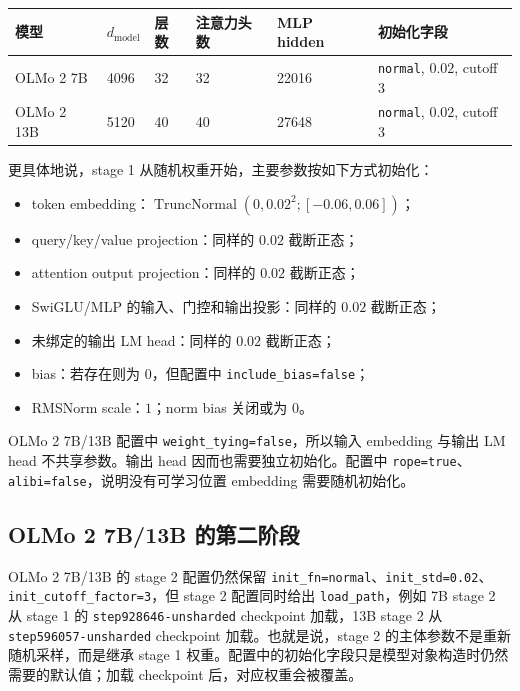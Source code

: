 \documentclass[UTF8,a4paper,11pt]{ctexart}
\newcommand{\TruncNormal}{\operatorname{TruncNormal}}
\begin{document}
\begin{center}
\begin{tabular}{llllll}
\toprule
模型 & $d_{\mathrm{model}}$ & 层数 & 注意力头数 & MLP hidden & 初始化字段 \\
\midrule
OLMo 2 7B & 4096 & 32 & 32 & 22016 & \texttt{normal}, $0.02$, cutoff $3$ \\
OLMo 2 13B & 5120 & 40 & 40 & 27648 & \texttt{normal}, $0.02$, cutoff $3$ \\
\bottomrule
\end{tabular}
\end{center}

更具体地说，stage 1 从随机权重开始，主要参数按如下方式初始化：

\begin{itemize}
  \item token embedding：$\TruncNormal(0,0.02^2;[-0.06,0.06])$；
  \item query/key/value projection：同样的 $0.02$ 截断正态；
  \item attention output projection：同样的 $0.02$ 截断正态；
  \item SwiGLU/MLP 的输入、门控和输出投影：同样的 $0.02$ 截断正态；
  \item 未绑定的输出 LM head：同样的 $0.02$ 截断正态；
  \item bias：若存在则为 $0$，但配置中 \texttt{include\_bias=false}；
  \item RMSNorm scale：$1$；norm bias 关闭或为 $0$。
\end{itemize}

OLMo 2 7B/13B 配置中 \texttt{weight\_tying=false}，所以输入 embedding 与输出 LM head 不共享参数。输出 head 因而也需要独立初始化。配置中 \texttt{rope=true}、\texttt{alibi=false}，说明没有可学习位置 embedding 需要随机初始化。

\subsection{OLMo 2 7B/13B 的第二阶段}

OLMo 2 7B/13B 的 stage 2 配置仍然保留 \texttt{init\_fn=normal}、\texttt{init\_std=0.02}、\texttt{init\_cutoff\_factor=3}，但 stage 2 配置同时给出 \texttt{load\_path}，例如 7B stage 2 从 stage 1 的 \texttt{step928646-unsharded} checkpoint 加载，13B stage 2 从 \texttt{step596057-unsharded} checkpoint 加载。也就是说，stage 2 的主体参数不是重新随机采样，而是继承 stage 1 权重。配置中的初始化字段只是模型对象构造时仍然需要的默认值；加载 checkpoint 后，对应权重会被覆盖。
\end{document}
